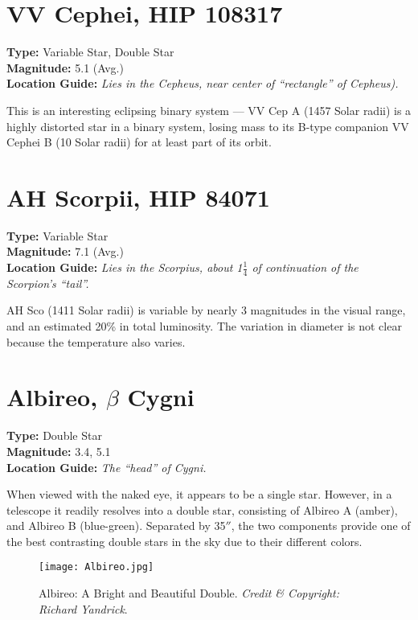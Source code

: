 \section{VV Cephei, HIP 108317}
\textbf{Type:} Variable Star, Double Star \\
\textbf{Magnitude:} 5.1 (Avg.) \\
\textbf{Location Guide:} \textit{Lies in the Cepheus, near center of ``rectangle'' of Cepheus).}

This is an interesting eclipsing binary system --- VV Cep A (1457 Solar radii) is a highly distorted star in a binary system, losing mass to its B-type companion VV Cephei B (10 Solar radii) for at least part of its orbit.

\section{AH Scorpii, HIP 84071}
\textbf{Type:} Variable Star \\
\textbf{Magnitude:} 7.1 (Avg.) \\
\textbf{Location Guide:} \textit{Lies in the Scorpius, about 1$\frac{1}{4}$ of continuation of the Scorpion's ``tail''.}

AH Sco (1411 Solar radii) is variable by nearly 3 magnitudes in the visual range, and an estimated 20\% in total luminosity. The variation in diameter is not clear because the temperature also varies.

\section{Albireo, \texorpdfstring{$\beta$}{beta} Cygni}
\textbf{Type:} Double Star \\
\textbf{Magnitude:} 3.4, 5.1 \\
\textbf{Location Guide:} \textit{The ``head'' of Cygni.}

When viewed with the naked eye, it appears to be a single star. However, in a telescope it readily resolves into a double star, consisting of Albireo A (amber), and Albireo B (blue-green). Separated by 35$''$, the two components provide one of the best contrasting double stars in the sky due to their different colors. 

\begin{figure}[ht]
\texttt{[image: Albireo.jpg]}
\caption{Albireo: A Bright and Beautiful Double. \emph{Credit \& Copyright: Richard Yandrick}.}
\label{fig:Albireo}
\end{figure}


